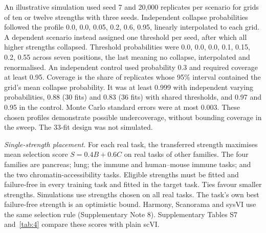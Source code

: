 An illustrative simulation used seed 7 and 20,000 replicates per scenario for grids of ten or twelve strengths with three seeds. Independent collapse probabilities followed the profile 0.0, 0.0, 0.05, 0.2, 0.6, 0.95, linearly interpolated to each grid. A dependent scenario instead assigned one threshold per seed, after which all higher strengths collapsed. Threshold probabilities were 0.0, 0.0, 0.0, 0.1, 0.15, 0.2, 0.55 across seven positions, the last meaning no collapse, interpolated and renormalised. An independent control used probability 0.3 and required coverage at least 0.95. Coverage is the share of replicates whose 95\% interval contained the grid's mean collapse probability. It was at least 0.999 with independent varying probabilities, 0.88 (30 fits) and 0.83 (36 fits) with shared thresholds, and 0.97 and 0.95 in the control. Monte Carlo standard errors were at most 0.003. These chosen profiles demonstrate possible undercoverage, without bounding coverage in the sweep. The 33-fit design was not simulated.

\noindent\textit{Single-strength placement.} For each real task, the transferred strength maximises mean selection score $S=0.4B+0.6C$ on real tasks of other families. The four families are pancreas; lung; the immune and human--mouse immune tasks; and the two chromatin-accessibility tasks. Eligible strengths must be fitted and failure-free in every training task and fitted in the target task. Ties favour smaller strengths. Simulations use strengths chosen on all real tasks. The task's own best failure-free strength is an optimistic bound. Harmony, Scanorama and sysVI use the same selection rule (Supplementary Note 8). Supplementary Tables S7 and~\ref{tab:4} compare these scores with plain scVI.
\par\endgroup
